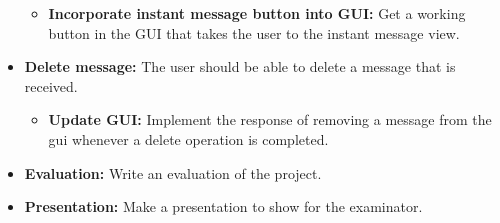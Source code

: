 \begin{itemize}
\begin{itemize}
\item{}\textbf{Incorporate instant message button into GUI:} Get a working button in the GUI that takes the user to the instant message view.
\end{itemize}
\item{}\textbf{Delete message:} The user should be able to delete a message that is received.
\begin{itemize}
\item{}\textbf{Update GUI:} Implement the response of removing a message from the gui whenever a delete operation is completed. 
\end{itemize}
\item{}\textbf{Evaluation:} Write an evaluation of the project.
\item{}\textbf{Presentation:} Make a presentation to show for the examinator.
\end{itemize}